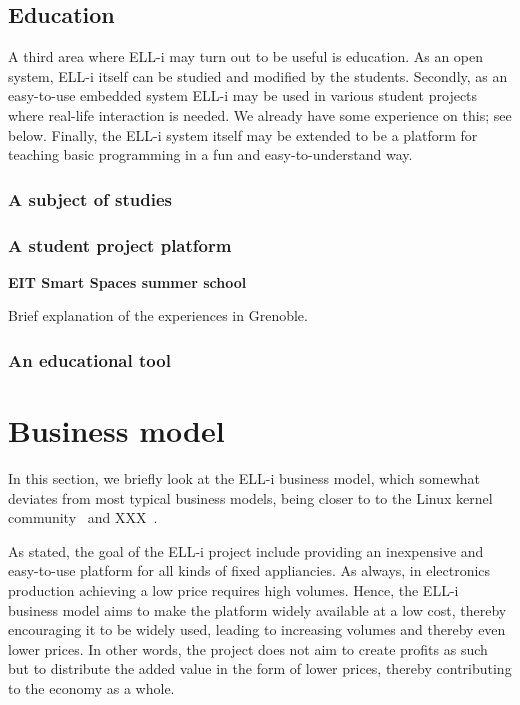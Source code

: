 \documentclass[draft,a4paper]{siamltex}
\begin{document}
\subsection{Education}

A third area where ELL-i may turn out to be useful is education.  As
an open system, ELL-i itself can be studied and modified by the
students.  Secondly, as an easy-to-use embedded system ELL-i may be
used in various student projects where real-life interaction is
needed.  We already have some experience on this; see below.  Finally,
the ELL-i system itself may be extended to be a platform for teaching
basic programming in a fun and easy-to-understand way.

\subsubsection{A subject of studies}


\subsubsection{A student project platform}

{\bf EIT Smart Spaces summer school}

Brief explanation of the experiences in Grenoble.

\subsubsection{An educational tool}

 

\section{Business model}
\label{sec:business}

In this section, we briefly look at the ELL-i business model, which
somewhat deviates from most typical business models, being closer to
to the Linux kernel community~\cite{Linux-kernel-need-reference}
and XXX~\cite{Something-else-need-reference}.

As stated, the goal of the ELL-i project include providing an
inexpensive and easy-to-use platform for all kinds of fixed
appliancies.  As always, in electronics production achieving a low
price requires high volumes.  Hence, the ELL-i business model aims to
make the platform widely available at a low cost, thereby encouraging
it to be widely used, leading to increasing volumes and thereby even
lower prices.  In other words, the project does not aim to
create profits as such but to distribute the added value in the form
of lower prices, thereby contributing to the economy as a whole.
\end{document}
